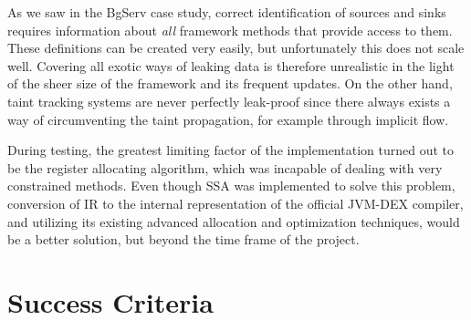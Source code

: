 \documentclass[12pt,twoside,notitlepage]{report}
\begin{document}
As we saw in the BgServ case study, correct identification of sources and sinks requires information about \emph{all} framework methods that provide access to them. These definitions can be created very easily, but unfortunately this does not scale well. Covering all exotic ways of leaking data is therefore unrealistic in the light of the sheer size of the framework and its frequent updates. On the other hand, taint tracking systems are never perfectly leak-proof since there always exists a way of circumventing the taint propagation, for example through implicit flow.

During testing, the greatest limiting factor of the implementation turned out to be the register allocating algorithm, which was incapable of dealing with very constrained methods. Even though SSA was implemented to solve this problem, conversion of IR to the internal representation of the official JVM-DEX compiler, and utilizing its existing advanced allocation and optimization techniques, would be a better solution, but beyond the time frame of the project.

\section{Success Criteria}
\end{document}
